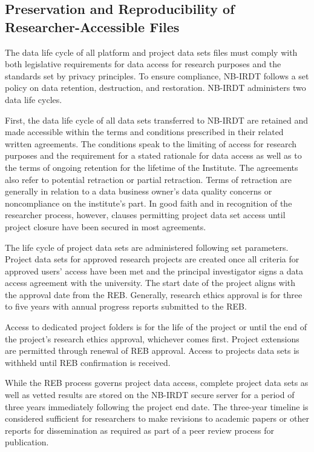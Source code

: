 \hypertarget{nbirdt-accessfile}{%
\subsection{Preservation and Reproducibility of Researcher-Accessible Files}\label{nbirdt-accessfile}}

The data life cycle of all platform and project data sets files must comply with both legislative requirements for data access for research purposes and the standards set by privacy principles. To ensure compliance, NB-IRDT follows a set policy on data retention, destruction, and restoration. NB-IRDT administers two data life cycles.

First, the data life cycle of all data sets transferred to NB-IRDT are retained and made accessible within the terms and conditions prescribed in their related written agreements. The conditions speak to the limiting of access for research purposes and the requirement for a stated rationale for data access as well as to the terms of ongoing retention for the lifetime of the Institute. The agreements also refer to potential retraction or partial retraction. Terms of retraction are generally in relation to a data business owner's data quality concerns or noncompliance on the institute's part. In good faith and in recognition of the researcher process, however, clauses permitting project data set access until project closure have been secured in most agreements.

The life cycle of project data sets are administered following set parameters. Project data sets for approved research projects are created once all criteria for approved users' access have been met and the principal investigator signs a data access agreement with the university. The start date of the project aligns with the approval date from the REB. Generally, research ethics approval is for three to five years with annual progress reports submitted to the REB.

Access to dedicated project folders is for the life of the project or until the end of the project's research ethics approval, whichever comes first. Project extensions are permitted through renewal of REB approval. Access to projects data sets is withheld until REB confirmation is received.

While the REB process governs project data access, complete project data sets as well as vetted results are stored on the NB-IRDT secure server for a period of three years immediately following the project end date. The three-year timeline is considered sufficient for researchers to make revisions to academic papers or other reports for dissemination as required as part of a peer review process for publication.

